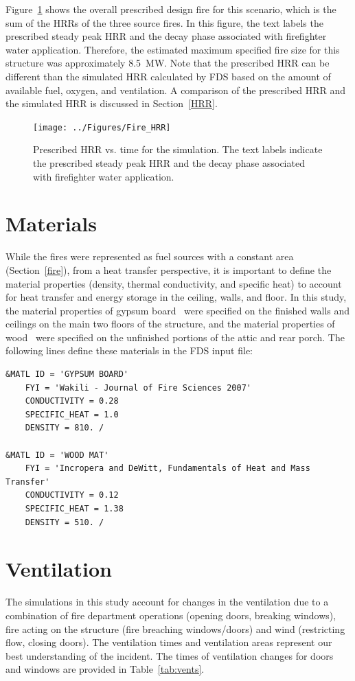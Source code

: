 \documentclass[12pt,oneside]{book}
\begin{document}
Figure~\ref{fig:hrr} shows the overall prescribed design fire for this scenario, which is the sum of the HRRs of the three source fires. In this figure, the text labels the prescribed steady peak HRR and the decay phase associated with firefighter water application. Therefore, the estimated maximum specified fire size for this structure was approximately 8.5~MW. Note that the prescribed HRR can be different than the simulated HRR calculated by FDS based on the amount of available fuel, oxygen, and ventilation. A comparison of the prescribed HRR and the simulated HRR is discussed in Section~\ref{HRR}.

\begin{figure}[!ht]
\texttt{[image: ../Figures/Fire\_HRR]}
\caption[Prescribed HRR vs. time for the simulation.]
{Prescribed HRR vs. time for the simulation. The text labels indicate the prescribed steady peak HRR and the decay phase associated with firefighter water application.}
\label{fig:hrr}
\end{figure}

\clearpage

\section{Materials}
\label{matl}
While the fires were represented as fuel sources with a constant area (Section~\ref{fire}), from a heat transfer perspective, it is important to define the material properties (density, thermal conductivity, and specific heat) to account for heat transfer and energy storage in the ceiling, walls, and floor. In this study, the material properties of gypsum board~\cite{WAKILI2007} were specified on the finished walls and ceilings on the main two floors of the structure, and the material properties of wood~\cite{Incropera:1} were specified on the unfinished portions of the attic and rear porch. The following lines define these materials in the FDS input file:

\begin{lstlisting}
&MATL ID = 'GYPSUM BOARD'
    FYI = 'Wakili - Journal of Fire Sciences 2007' 
    CONDUCTIVITY = 0.28
    SPECIFIC_HEAT = 1.0
    DENSITY = 810. /

&MATL ID = 'WOOD MAT'
    FYI = 'Incropera and DeWitt, Fundamentals of Heat and Mass Transfer'
    CONDUCTIVITY = 0.12
    SPECIFIC_HEAT = 1.38
    DENSITY = 510. / 
\end{lstlisting}

\section{Ventilation}
\label{Vents}
The simulations in this study account for changes in the ventilation due to a combination of fire department operations (opening doors, breaking windows), fire acting on the structure (fire breaching windows/doors) and wind (restricting flow, closing doors). The ventilation times and ventilation areas represent our best understanding of the incident. The times of ventilation changes for doors and windows are provided in Table~\ref{tab:vents}.
\end{document}
